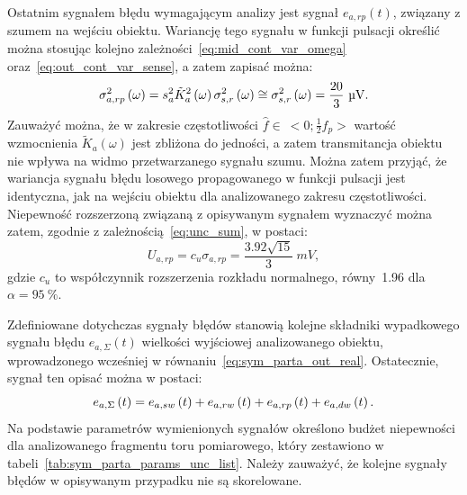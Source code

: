 Ostatnim sygnałem błędu wymagającym analizy jest sygnał $e_{a,rp}(t)$, związany z szumem na wejściu obiektu. Wariancję tego sygnału w funkcji pulsacji określić można stosując kolejno zależności~\eqref{eq:mid_cont_var_omega} oraz~\eqref{eq:out_cont_var_sense}, a zatem zapisać można:
\begin{equation}
\sigma_{a,rp}^{2} \emb{\omega} = s_{a}^{2} \tilde{K}_{a}^{2} \emb{\omega} \sigma_{s,r}^{2} \emb{\omega} \cong \sigma_{s,r}^{2} \emb{\omega} = \frac{20}{3}~\unit{\micro V} \label{eq:sym_parta_rand_prop_var_omega}.
\end{equation}
Zauważyć można, że w zakresie częstotliwości $\hat{f} \in~<0;\frac{1}{2} f_{p}>$ wartość wzmocnienia $\tilde{K}_{a}(\omega)$ jest zbliżona do jedności, a zatem transmitancja obiektu nie wpływa na widmo przetwarzanego sygnału szumu. Można zatem przyjąć, że wariancja sygnału błędu losowego propagowanego w funkcji pulsacji jest identyczna, jak na wejściu obiektu dla analizowanego zakresu częstotliwości. Niepewność rozszerzoną związaną z opisywanym sygnałem wyznaczyć można zatem, zgodnie z zależnością~\eqref{eq:unc_sum}, w postaci:
\begin{equation}
U_{a,rp} = c_{u} \sigma_{a,rp} = \frac{\num{3.92} \sqrt{15}}{3}~\unit{mV} \label{eq:sym_parta_rand_prop_unc},
\end{equation}
gdzie $c_{u}$ to współczynnik rozszerzenia rozkładu normalnego, równy~\num{1.96} dla $\alpha = \qty{95}{\percent}$.

Zdefiniowane dotychczas sygnały błędów stanowią kolejne składniki wypadkowego sygnału błędu $e_{a,\Sigma}(t)$ wielkości wyjściowej analizowanego obiektu, wprowadzonego wcześniej w równaniu~\eqref{eq:sym_parta_out_real}. Ostatecznie, sygnał ten opisać można w postaci:
\begin{equation}
e_{a,\Sigma} \left(t\right) = e_{a,sw} \left(t\right) + e_{a,rw} \left(t\right) + e_{a,rp} \left(t\right) + e_{a,dw} \left(t\right) \label{eq:sym_parta_error_sum}.
\end{equation}
Na podstawie parametrów wymienionych sygnałów określono budżet niepewności dla analizowanego fragmentu toru pomiarowego, który zestawiono w tabeli~\ref{tab:sym_parta_params_unc_list}. Należy zauważyć, że kolejne sygnały błędów w opisywanym przypadku nie są skorelowane.

